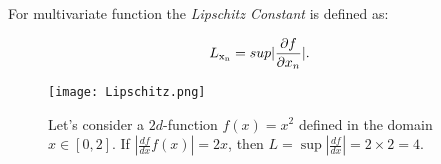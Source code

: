 For multivariate function the \textit{Lipschitz Constant} is defined as:

\begin{equation}
L\textsubscript{x\textsubscript{n}} = sup|\dfrac{\partial f}{\partial x_n}|.
\end{equation}

\begin{figure} [h!]
	\centering
	\texttt{[image: Lipschitz.png]}
	\caption{Let's consider a $2d$-function $f(x) = x^2$ defined in the domain $x \in [0, 2]$. If $|\frac{df}{dx} f(x) | = 2x$, then $L = \sup |\frac{df}{dx}| = 2 \times 2 = 4$.}
	\label{fig:Lipschitz}
\end{figure}

